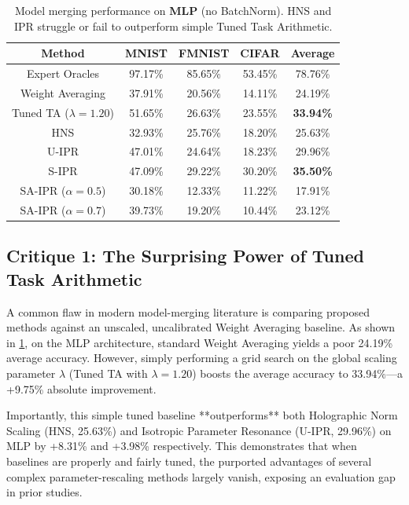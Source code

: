 \documentclass{article}
\begin{document}
\begin{table}[t]
\caption{Model merging performance on \textbf{MLP} (no BatchNorm). HNS and IPR struggle or fail to outperform simple Tuned Task Arithmetic.}
\label{tab:mlp_results}
\begin{center}
\begin{small}
\setlength{\tabcolsep}{2pt}
\begin{tabular}{ccccc}
\toprule
Method & MNIST & FMNIST & CIFAR & Average \\
\midrule
Expert Oracles & 97.17\% & 85.65\% & 53.45\% & 78.76\% \\
\midrule
Weight Averaging & 37.91\% & 20.56\% & 14.11\% & 24.19\% \\
Tuned TA ($\lambda = 1.20$) & 51.65\% & 26.63\% & 23.55\% & \textbf{33.94\%} \\
\midrule
HNS & 32.93\% & 25.76\% & 18.20\% & 25.63\% \\
U-IPR & 47.01\% & 24.64\% & 18.23\% & 29.96\% \\
S-IPR & 47.09\% & 29.22\% & 30.20\% & \textbf{35.50\%} \\
SA-IPR ($\alpha = 0.5$) & 30.18\% & 12.33\% & 11.22\% & 17.91\% \\
SA-IPR ($\alpha = 0.7$) & 39.73\% & 19.20\% & 10.44\% & 23.12\% \\
\bottomrule
\end{tabular}
\end{small}
\end{center}
\end{table}

\subsection{Critique 1: The Surprising Power of Tuned Task Arithmetic}
A common flaw in modern model-merging literature is comparing proposed methods against an unscaled, uncalibrated Weight Averaging baseline. As shown in \cref{tab:mlp_results}, on the MLP architecture, standard Weight Averaging yields a poor 24.19\% average accuracy. However, simply performing a grid search on the global scaling parameter $\lambda$ (Tuned TA with $\lambda = 1.20$) boosts the average accuracy to 33.94\%—a +9.75\% absolute improvement.

Importantly, this simple tuned baseline **outperforms** both Holographic Norm Scaling (HNS, 25.63\%) and Isotropic Parameter Resonance (U-IPR, 29.96\%) on MLP by +8.31\% and +3.98\% respectively. This demonstrates that when baselines are properly and fairly tuned, the purported advantages of several complex parameter-rescaling methods largely vanish, exposing an evaluation gap in prior studies.
\end{document}
